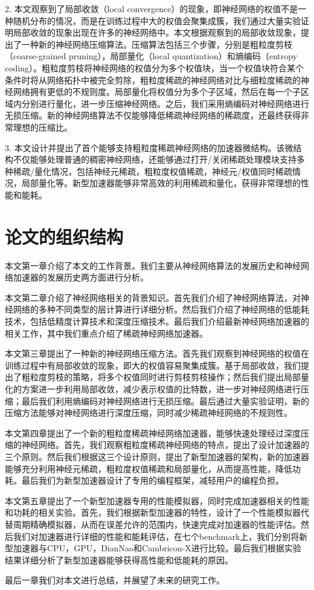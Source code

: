 2. 本文观察到了局部收敛（local convergence）的现象，即神经网络的权值不是一种随机分布的情况，而是在训练过程中大的权值会聚集成簇，我们通过大量实验证明局部收敛的现象出现在许多的神经网络中。本文根据观察到的局部收敛现象，提出了一种新的神经网络压缩算法。压缩算法包括三个步骤，分别是粗粒度剪枝（coarse-grained pruning），局部量化（local quantization）和熵编码（entropy coding）。粗粒度剪枝将神经网络的权值分为多个权值块，当一个权值块符合某个条件时将从网络拓扑中被完全剪除，粗粒度稀疏的神经网络对比与细粒度稀疏的神经网络拥有更低的不规则度。局部量化将权值分为多个子区域，然后在每一个子区域内分别进行量化，进一步压缩神经网络。之后，我们采用熵编码对神经网络进行无损压缩。新的神经网络算法不仅能够降低稀疏神经网络的稀疏度，还最终获得非常理想的压缩比。

3. 本文设计并提出了首个能够支持粗粒度稀疏神经网络的加速器微结构。该微结构不仅能够处理普通的稠密神经网络，还能够通过打开/关闭稀疏处理模块支持多种稀疏/量化情况，包括神经元稀疏，粗粒度权值稀疏，神经元/权值同时稀疏情况，局部量化等。新型加速器能够非常高效的利用稀疏和量化，获得非常理想的性能和能耗。

\section{论文的组织结构}
本文第一章介绍了本文的工作背景。我们主要从神经网络算法的发展历史和神经网络加速器的发展历史两方面进行分析。

本文第二章介绍了神经网络相关的背景知识。首先我们介绍了神经网络算法，对神经网络的多种不同类型的层计算进行详细分析。然后我们介绍了神经网络的低能耗技术，包括低精度计算技术和深度压缩技术。最后我们介绍最新神经网络加速器的相关工作，其中我们重点介绍了稀疏神经网络加速器。

本文第三章提出了一种新的神经网络压缩方法。首先我们观察到神经网络的权值在训练过程中有局部收敛的现象，即大的权值容易聚集成簇。基于局部收敛，我们提出了粗粒度剪枝的策略，将多个权值同时进行剪枝剪枝操作；然后我们提出局部量化的方案进一步利用局部收敛，减少表示权值的比特数，进一步对神经网络进行压缩；最后我们利用熵编码对神经网络进行无损压缩。最后通过大量实验证明，新的压缩方法能够对神经网络进行深度压缩，同时减少稀疏神经网络的不规则性。

本文第四章提出了一个新的粗粒度稀疏神经网络加速器，能够快速处理经过深度压缩的神经网络。首先，我们观察粗粒度稀疏神经网络的特点，提出了设计加速器的三个原则。然后我们根据这三个设计原则，提出了新型加速器的架构，新的加速器能够充分利用神经元稀疏，粗粒度权值稀疏和局部量化，从而提高性能，降低功耗。最后我们为新型加速器设计了专用的编程框架，减轻用户的编程负担。

本文第五章提出了一个新型加速器专用的性能模拟器，同时完成加速器相关的性能和功耗的相关实验。首先，我们根据新型加速器的特性，设计了一个性能模拟器代替周期精确模拟器，从而在误差允许的范围内，快速完成对加速器的性能评估。然后我们对加速器进行详细的性能和能耗评估，在七个benchmark上，我们分别将新型加速器与CPU，GPU，DianNao和Cambricon-X进行比较。最后我们根据实验结果详细分析了新型加速器能够获得高性能和低能耗的原因。

最后一章我们对本文进行总结，并展望了未来的研究工作。
